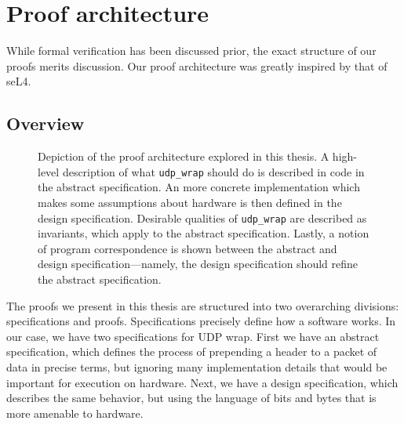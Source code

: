 \documentclass[twoside]{memoir}
\begin{document}
\section{Proof architecture}
While formal verification has been discussed prior,
the exact structure of our proofs merits discussion.
Our proof architecture was greatly inspired by that of seL4.

\subsection{Overview}
\begin{figure}[h]
    \centering
    \caption{Depiction of the proof architecture explored in this thesis.
    A high-level description of what \lstinline{udp_wrap} should do
    is described in code in the abstract specification.
    An more concrete implementation which makes some assumptions about hardware
    is then defined in the design specification.
    Desirable qualities of \lstinline{udp_wrap} are described as invariants,
    which apply to the abstract specification.
    Lastly, a notion of program correspondence is shown between the
    abstract and design specification---namely, the design specification
    should refine the abstract specification.
    }
    \label{fig:proof-structure-abstract-design}
\end{figure}
The proofs we present in this thesis are structured into 
two overarching divisions: specifications and proofs.
Specifications precisely define how a software works.
In our case, we have two specifications for UDP wrap.
First we have an abstract specification,
which defines the process of prepending a header to a packet of data
in precise terms, but ignoring many implementation details that would
be important for execution on hardware.
Next, we have a design specification,
which describes the same behavior, but using the language of bits and bytes
that is more amenable to hardware.
\end{document}
